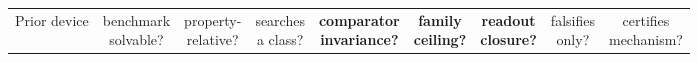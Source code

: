 \begin{table}[t]
\begin{threeparttable}
\begin{tabular}{@{}l cccccccc@{}}
\toprule
Prior device & \makecell{benchmark\\solvable?} & \makecell{property-\\relative?} & \makecell{searches\\a class?} & \makecell{\textbf{comparator}\\\textbf{invariance?}} & \makecell{\textbf{family}\\\textbf{ceiling?}} & \makecell{\textbf{readout}\\\textbf{closure?}} & \makecell{falsifies\\only?} & \makecell{certifies\\mechanism?} \\

\end{tabular}
\end{threeparttable}
\end{table}
